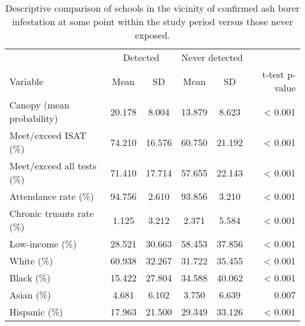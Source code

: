 \begin{table}[!h]

\caption{\label{tab:descriptive-table}Descriptive comparison of schools in the vicinity of confirmed ash borer infestation at some point within the study period versus those never exposed.}
\centering
\begin{tabular}[t]{lccccr}
\toprule
\multicolumn{1}{c}{ } & \multicolumn{2}{c}{Detected} & \multicolumn{2}{c}{Never detected} & \multicolumn{1}{c}{ } \\
\cmidrule(l{3pt}r{3pt}){2-3} \cmidrule(l{3pt}r{3pt}){4-5}
Variable & Mean & SD & Mean & SD & t-test p-value\\
\midrule
Canopy (mean probability) & 20.178 & 8.004 & 13.879 & 8.623 & < 0.001\\
Meet/exceed ISAT (\%) & 74.210 & 16.576 & 60.750 & 21.192 & < 0.001\\
Meet/exceed all tests (\%) & 71.410 & 17.714 & 57.655 & 22.143 & < 0.001\\
Attendance rate (\%) & 94.756 & 2.610 & 93.856 & 3.210 & < 0.001\\
Chronic truants rate (\%) & 1.125 & 3.212 & 2.371 & 5.584 & < 0.001\\
\addlinespace
Low-income (\%) & 28.521 & 30.663 & 58.453 & 37.856 & < 0.001\\
White (\%) & 60.938 & 32.267 & 31.722 & 35.455 & < 0.001\\
Black (\%) & 15.422 & 27.804 & 34.588 & 40.062 & < 0.001\\
Asian (\%) & 4.681 & 6.102 & 3.750 & 6.639 & 0.007\\
Hispanic (\%) & 17.963 & 21.500 & 29.349 & 33.126 & < 0.001\\
\bottomrule
\end{tabular}
\end{table}
